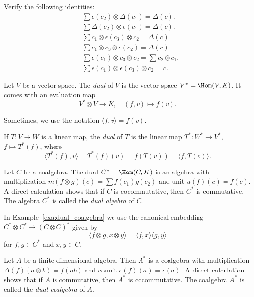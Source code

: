 \documentclass[12pt]{amsproc}
\begin{document}
\begin{exercise}
\label{xca:Sweedler}
    Verify the following identities:
    \begin{align}
        &\sum\epsilon(c_{2})\otimes \Delta(c_{1})
        =\Delta(c).\\
        &\sum\Delta(c_{2})\otimes \epsilon(c_{1})=\Delta(c).\\
        &\sum c_{1}\otimes\epsilon (c_{3})\otimes c_{2}=\Delta(c)\\
        &
        \sum c_{1}\otimes c_{3}\otimes \epsilon (c_{2})=\Delta(c).\\
        &\sum \epsilon(c_{1})\otimes c_{3}\otimes c_{2}=
        \sum c_{2}\otimes c_{1}.\\
        &\sum \epsilon(c_{1})\otimes\epsilon(c_{3})\otimes c_{2}=c.
    \end{align}
\end{exercise}

Let $V$ be a vector space. The \emph{dual} of $V$ 
is the vector space $V^*=\Hom(V,K)$. It comes with 
an evaluation map
\[
V^*\otimes V\to K,\quad 
(f,v)\mapsto f(v).
\]

Sometimes, we use the notation $\langle f,v\rangle=f(v)$. 

If $T\colon V\to W$ is a linear map, 
the \emph{dual} of $T$ is the linear 
map $T^*\colon W^*\to V^*$, $f\mapsto T^*(f)$, where 
\[
\langle T^*(f),v\rangle=T^*(f)(v)=f(T(v))=\langle f,T(v)\rangle.
\]

\begin{example}
\label{exa:dual_coalgebra}
    Let $C$ be a coalgebra. The dual 
    $C^*=\Hom(C,K)$ is an algebra
    with multiplication 
    $m(f\otimes g)(c)=\sum f(c_1)g(c_2)$ 
    and unit $u(f)(c)=f(c)$. A direct calculation 
    shows that if $C$ is cocommutative, then $C^*$ is commutative. The algebra $C^*$ is called the
    \emph{dual algebra} of $C$. 
\end{example}

In Example~\ref{exa:dual_coalgebra} we use 
the canonical 
embedding $C^*\otimes C^*\to (C\otimes C)^*$ given by 
\[
\langle f\otimes g,x\otimes y\rangle
=\langle f,x\rangle\langle g,y\rangle
\]
for $f,g\in C^*$ and $x,y\in C$. 


\begin{example}
\label{exa:dual_algebra}
    Let $A$ be a finite-dimensional algebra. Then $A^*$ is 
    a coalgebra with multiplication 
    $\Delta(f)(a\otimes b)=f(ab)$ and counit 
    $\epsilon(f)(a)=\epsilon(a)$. A direct calculation shows that 
    if $A$ is commutative, then $A^*$ is cocommutative. The  
    coalgebra $A^*$ is called the \emph{dual coalgebra} of $A$. 
\end{example}
\end{document}
